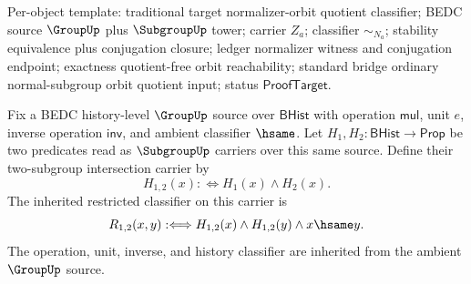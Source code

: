 Per-object template: traditional target normalizer-orbit quotient classifier;
BEDC source $\GroupUp$ plus $\SubgroupUp$ tower; carrier $Z_a$; classifier
$\sim_{N_a}$; stability equivalence plus conjugation closure; ledger normalizer
witness and conjugation endpoint; exactness quotient-free orbit reachability;
standard bridge ordinary normal-subgroup orbit quotient input; status
$\mathsf{ProofTarget}$.

\begin{definition}
\label{def:subgroup-abstract-two-intersection-carrier}
Fix a BEDC history-level $\GroupUp$ source over $\mathsf{BHist}$ with operation $\mathsf{mul}$, unit $e$, inverse operation $\mathsf{inv}$, and ambient classifier $\hsame$. Let $H_1,H_2:\mathsf{BHist}\to\mathsf{Prop}$ be two predicates read as $\SubgroupUp$ carriers over this same source. Define their two-subgroup intersection carrier by
$$
H_{1,2}(x) :\Longleftrightarrow H_1(x)\land H_2(x).
$$
The inherited restricted classifier on this carrier is
$$
R_{1,2}(x,y) :\Longleftrightarrow H_{1,2}(x)\land H_{1,2}(y)\land x\hsame y.
$$
The operation, unit, inverse, and history classifier are inherited from the ambient $\GroupUp$ source.
\end{definition}

